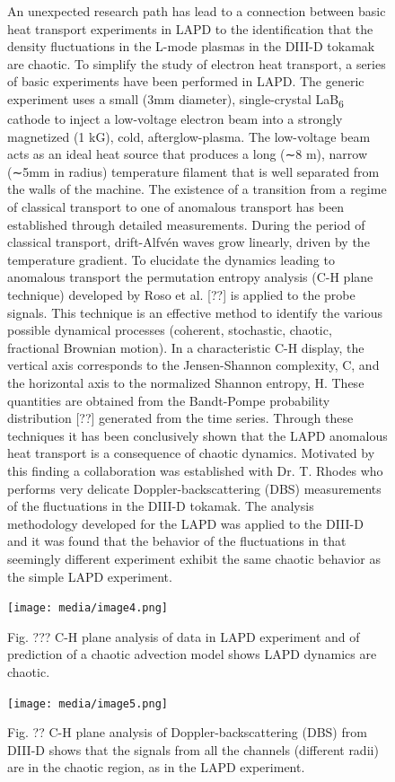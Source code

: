 \documentclass[11pt]{article}
\begin{document}
\begin{description}
\begin{figure}[!htbp]
An unexpected research path has lead to a connection between basic heat
transport experiments in LAPD to the identification that the density
fluctuations in the L-mode plasmas in the DIII-D tokamak are chaotic. To
simplify the study of electron heat transport, a series of basic
experiments have been performed in LAPD. The generic experiment uses a
small (3mm diameter), single-crystal LaB\textsubscript{6} cathode to
inject a low-voltage electron beam into a strongly magnetized (1 kG),
cold, afterglow-plasma. The low-voltage beam acts as an ideal heat
source that produces a long (∼8 m), narrow (∼5mm in radius) temperature
filament that is well separated from the walls of the machine. The
existence of a transition from a regime of classical transport to one of
anomalous transport has been established through detailed measurements.
During the period of classical transport, drift-Alfvén waves grow
linearly, driven by the temperature gradient. To elucidate the dynamics
leading to anomalous transport the permutation entropy analysis (C-H
plane technique) developed by Roso et al. {[}??{]} is applied to the
probe signals. This technique is an effective method to identify the
various possible dynamical processes (coherent, stochastic, chaotic,
fractional Brownian motion). In a characteristic C-H display, the
vertical axis corresponds to the Jensen-Shannon complexity, C, and the
horizontal axis to the normalized Shannon entropy, H. These quantities
are obtained from the Bandt-Pompe probability distribution {[}??{]}
generated from the time series. Through these techniques it has been
conclusively shown that the LAPD anomalous heat transport is a
consequence of chaotic dynamics. Motivated by this finding a
collaboration was established with Dr. T. Rhodes who performs very
delicate Doppler-backscattering (DBS) measurements of the fluctuations
in the DIII-D tokamak. The analysis methodology developed for the LAPD
was applied to the DIII-D and it was found that the behavior of the
fluctuations in that seemingly different experiment exhibit the same
chaotic behavior as the simple LAPD experiment.

\texttt{[image: media/image4.png]}

Fig. ??? C-H plane analysis of data in LAPD experiment and of prediction
of a chaotic advection model shows LAPD dynamics are chaotic.

\texttt{[image: media/image5.png]}

Fig. ?? C-H plane analysis of Doppler-backscattering (DBS) from DIII-D
shows that the signals from all the channels (different radii) are in
the chaotic region, as in the LAPD experiment.


\end{figure}
\end{description}
\end{document}
